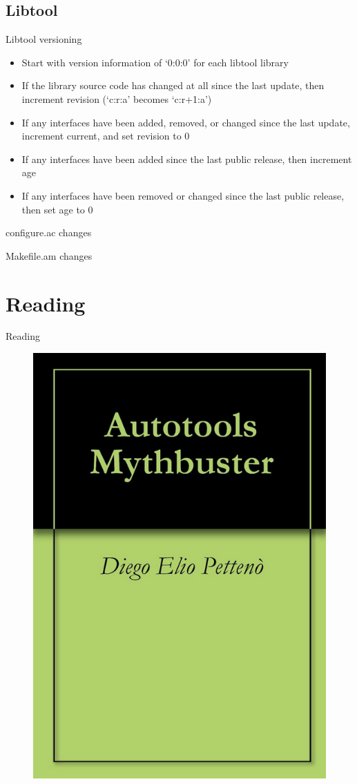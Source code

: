 \documentclass{beamer}
\begin{document}
\subsection{Libtool}

\begin{frame}{Libtool versioning}
	\begin{itemize}
	\item Start with version information of ‘0:0:0’ for each libtool library
	\item If the library source code has changed at all since the last update, then increment revision (‘c:r:a’ becomes ‘c:r+1:a’)
	\item If any interfaces have been added, removed, or changed since the last update, increment current, and set revision to 0
	\item If any interfaces have been added since the last public release, then increment age
	\item If any interfaces have been removed or changed since the last public release, then set age to 0
	\end{itemize}
\end{frame}

\begin{frame}[t]{configure.ac changes}
	\begin{small}
	
	\end{small}
\end{frame}

\begin{frame}[t]{Makefile.am changes}
	\begin{small}
	
	\end{small}
\end{frame}


\section{Reading}

\begin{frame}{Reading}
	\begin{figure}
	\includegraphics[width= 0.4\linewidth]{mythbuster.png}
	\end{figure}
\end{frame}
\end{document}
